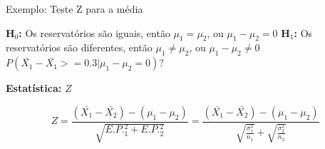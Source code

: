 \documentclass{beamer}\usepackage[]{graphicx}\usepackage[]{color}
\begin{document}
\begin{frame}{Exemplo: Teste Z para a média}

\textbf{H$_0$:} Os reservatórios são iguais, então $\mu_1 = \mu_2$, ou $\mu_1 - \mu_2 = 0$
\vfill
\textbf{H$_1$:} Os reservatórios são diferentes, então $\mu_1 \neq \mu_2$, ou $\mu_1 - \mu_2 \neq 0$
\vfill
$P(\bar{X_1} -  \bar{X_1} >= 0.3 | \mu_1 - \mu_2 = 0)$?
\vfill

\textbf{Estatística:} $Z$

\vfill

\begin{equation*}
    Z = \frac{(\bar{X_1}-\bar{X_2}) - (\mu_1 - \mu_2)}{\sqrt{E.P._1^2 + E.P._2^2}} = \frac{(\bar{X_1}-\bar{X_2}) - (\mu_1 - \mu_2)}{\sqrt{\frac{\sigma_1^2}{n_1}} + \sqrt{\frac{\sigma_2^2}{n_2}}}
        
\end{equation*}

\end{frame} 
\end{document}
